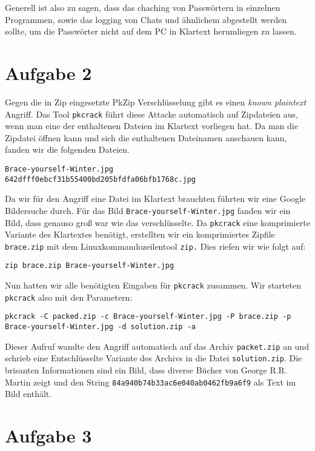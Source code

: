 \documentclass[10pt,a4paper]{article}
\begin{document}
Generell ist also zu sagen, dass das chaching von Passwörtern in einzelnen Programmen, sowie das logging von Chats und ähnlichem abgestellt werden sollte, um die Passwörter nicht auf dem PC in Klartext herumliegen zu lassen.

\section*{Aufgabe 2}

Gegen die in Zip eingesetzte PkZip Verschlüsselung gibt es einen \textit{known plaintext} Angriff. Das Tool \texttt{pkcrack} führt diese Attacke automatisch auf Zipdateien aus, wenn man eine der enthaltenen Dateien im Klartext vorliegen hat. Da man die Zipdatei öffnen kann und sich die enthaltenen Dateinamen anschauen kann, fanden wir die folgenden Dateien.
\begin{verbatim}
Brace-yourself-Winter.jpg
642dfff0ebcf31b55400bd205bfdfa06bfb1768c.jpg
\end{verbatim}

Da wir für den Angriff eine Datei im Klartext brauchten führten wir eine Google Bildersuche durch. Für das Bild \texttt{Brace-yourself-Winter.jpg} fanden wir ein Bild, dass genauso groß war wie das verschlüsselte. Da \texttt{pkcrack} eine komprimierte Variante des Klartextes benötigt, erstellten wir ein komprimiertes Zipfile \texttt{brace.zip} mit dem Linuxkommandozeilentool \texttt{zip.} Dies riefen wir wie folgt auf:
\begin{verbatim}
zip brace.zip Brace-yourself-Winter.jpg
\end{verbatim}

Nun hatten wir alle benötigten Eingaben für \texttt{pkcrack} zusammen. Wir starteten \texttt{pkcrack} also mit den Parametern:
\begin{small}
\begin{verbatim}
pkcrack -C packed.zip -c Brace-yourself-Winter.jpg -P brace.zip -p Brace-yourself-Winter.jpg -d solution.zip -a
\end{verbatim}
\end{small}

Dieser Aufruf wandte den Angriff automatisch auf das Archiv \texttt{packet.zip} an und schrieb eine Entschlüsselte Variante des Archivs in die Datei \texttt{solution.zip}. Die brisanten Informationen sind ein Bild, dass diverse Bücher von George R.R. Martin zeigt und den String \texttt{84a940b74b33ac6e040ab0462fb9a6f9} als Text im Bild enthält.


\section*{Aufgabe 3}
\end{document}
